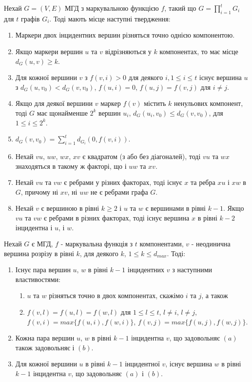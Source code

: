 \begin{lemma}
  Нехай $G=(V,E)$ МГД з маркувальною функцією $f$, такий що $\displaystyle G=\prod_{i=1}^t G_i$ для $t$ графів $G_i$.
Тоді мають місце наступні твердження:
\begin{enumerate}
\item Маркери двох інцидентних вершин різняться точно однією компонентою.
\item Якщо маркери вершин $u$ та $v$ відрізняються у $k$ компонентах, то має місце $d_G(u,v) \ge k$.
\item Для кожної вершини $v$ з $f(v,i) > 0$ для деякого $i,1 \le i \le t$ існує вершина $u$ з $d_G(u,v_0) < d_G(v,v_0)$, $f(u,i)=0$, $f(u,j)=f(v,j)$ для $i \ne j$.
\item Якщо для деякої вершини $v$ маркер $f(v)$ містить $k$ ненульових компонент, тоді $G$ має щонайменше $2^k$ вершин $u_i$, $d_G(u_i,v_0) \le d_G(v,v_0)$, для $1 \le i \le 2^k$.
\item $d_G(v,v_0)=\sum_{i=1}^t d_{G_i}(0,f(v,i))$.
\item Нехай $vu$, $uw$, $wx$, $xv$ є квадратом (з або без діагоналей), тоді $vu$ та $wx$ знаходяться в такому ж факторі, що і $uw$ та $xv$.
\item Нехай $vu$ та $vw$ є ребрами у різних факторах, тоді існує $x$ та ребра $xu$ і $xw$ в $G$, причому ні $xv$, ні $uw$ не є ребрами графа $G$.
\item Нехай $v$ є вершиною в рівні $k \ge 2$ і $u$ та $w$ є вершинами в рівні $k-1$. Якщо $vu$ та $vw$ є ребрами в різних факторах, тоді існує вершина $x$ в рівні $k-2$ інцидентна і $u$, і $w$.
\end{enumerate}
\end{lemma}

\begin{lemma}
  Нехай $G$ є МГД, $f$ - маркувальна функція з $t$ компонентами, $v$ - неодинична вершина розрізу в рівні $k$, для деякого $k$, $1 \le k \le d_{max}$. Тоді:
  \begin{enumerate}
    \item Існує пара вершин $u$, $w$ в рівні $k-1$ інцидентних $v$ з наступними властивостями:
      \begin{enumerate}
        \item $u$ та $w$ різняться точно в двох компонентах, скажімо $i$ та $j$, а також
        \item $f(v,l)=f(u,l)=f(w,l)$ для $1 \le l \le t$, $l \ne i$, $l \ne j$, $f(v,i)=max \lbrace f(u,i),f(w,i) \rbrace$, $f(v,j)=max \lbrace f(u,j),f(w,j) \rbrace$.
      \end{enumerate}
    \item Кожна пара вершин $u$, $w$ в рівні $k-1$ інцидентна $v$, що задовольняє $(a)$ також задовольняє і $(b)$.
    \item Для кожної вершини $u$ в рівні $k-1$ інцидентної $v$, існує вершина $w$ в рівні $k-1$ інцидентна $v$, що задовольняє $(a)$ і $(b)$.
  \end{enumerate}
\end{lemma}

